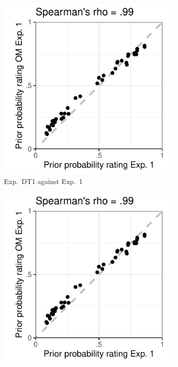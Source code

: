 \documentclass[11pt,fleqn]{article}
\newcommand{\6}{\mbox{$[\hspace*{-.6mm}[$}}
\newcommand{\9}{\mbox{$]\hspace*{-.6mm}]$}}
\begin{document}
\begin{figure}[h!]
\centering
\begin{subfigure}[t]{.3\textwidth}
\centering
\includegraphics[width=\textwidth]{../../results/exp1/graphs/SUP-priorExp1-by-priorOMExp1}
\caption{Exp.~DT1 against Exp.~1}\label{fig:prior-exp1-expDT1}
\end{subfigure} \hfill \begin{subfigure}[t]{.3\textwidth}
\centering
\includegraphics[width=\textwidth]{../../results/exp1/graphs/SUP-priorExp1-by-priorOMExp1}

\end{subfigure}
\end{figure}
\end{document}
